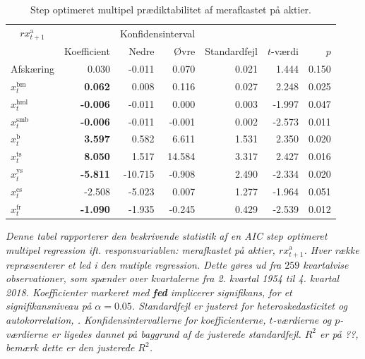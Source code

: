\documentclass[
  a4paper,
  oneside]{memoir}
\begin{document}
\begin{table}[H]

\caption{\label{tab:MULT-step-ak}Step optimeret multipel prædiktabilitet af merafkastet på aktier.}
\centering
\begin{threeparttable}
\begin{tabular}[t]{lrrrrrr}
\toprule
\multicolumn{1}{c}{$rx_{t+1}^{\text{a}}$} & \multicolumn{1}{c}{ } & \multicolumn{2}{c}{Konfidensinterval} & \multicolumn{3}{c}{ } \\
\cmidrule(l{3pt}r{3pt}){1-1} \cmidrule(l{3pt}r{3pt}){3-4}
  & Koefficient & Nedre & Øvre & Standardfejl & $t$-værdi & $p$\\
\midrule
\rowcolor{gray!6}  Afskæring & 0.030 & -0.011 & 0.070 & 0.021 & 1.444 & 0.150\\
$x_t^{\text{bm}}$ & \textbf{ 0.062} & 0.008 & 0.116 & 0.027 & 2.248 & 0.025\\
\rowcolor{gray!6}  $x_t^{\text{hml}}$ & \textbf{-0.006} & -0.011 & 0.000 & 0.003 & -1.997 & 0.047\\
$x_t^{\text{smb}}$ & \textbf{-0.006} & -0.011 & -0.001 & 0.002 & -2.573 & 0.011\\
\rowcolor{gray!6}  $x_t^{\text{b}}$ & \textbf{ 3.597} & 0.582 & 6.611 & 1.531 & 2.350 & 0.020\\
$x_t^{\text{ts}}$ & \textbf{ 8.050} & 1.517 & 14.584 & 3.317 & 2.427 & 0.016\\
\rowcolor{gray!6}  $x_t^{\text{ys}}$ & \textbf{-5.811} & -10.715 & -0.908 & 2.490 & -2.334 & 0.020\\
$x_t^{\text{cs}}$ & -2.508 & -5.023 & 0.007 & 1.277 & -1.964 & 0.051\\
\rowcolor{gray!6}  $x_t^{\text{fr}}$ & \textbf{-1.090} & -1.935 & -0.245 & 0.429 & -2.539 & 0.012\\
\bottomrule
\end{tabular}
\begin{tablenotes}
\item \textit{Denne tabel rapporterer den beskrivende statistik af en AIC step optimeret multipel regression ift. responsvariablen: merafkastet på aktier, $rx_{t+1}^{\text{a}}$. Hver række repræsenterer et led i den mutiple regression. Dette gøres ud fra $259$ kvartalvise observationer, som spænder over kvartalerne fra 2. kvartal 1954 til 4. kvartal 2018. Koefficienter markeret med \textbf{fed} implicerer signifikans, for et signifikansniveau på $\alpha=0.05$. Standardfejl er justeret for heteroskedasticitet og autokorrelation, \citep{Newey1987}. Konfidensintervallerne for koefficienterne, $t$-værdierne og $p$-værdierne er ligedes dannet på baggrund af de justerede standardfejl. $R^2$ er på ??, bemærk dette er den justerede $R^2$.}
\end{tablenotes}
\end{threeparttable}
\end{table}
\end{document}
